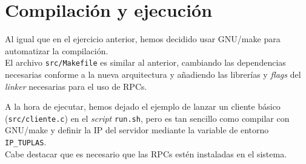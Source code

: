 \section{Compilación y ejecución}

Al igual que en el ejercicio anterior, hemos decidido usar GNU/make para automatizar la compilación.\\
El archivo \texttt{src/Makefile} es similar al anterior, cambiando las dependencias necesarias conforme a la nueva arquitectura y añadiendo las librerías y \textit{flags} del \textit{linker} necesarias para el uso de RPCs.\newline

A la hora de ejecutar, hemos dejado el ejemplo de lanzar un cliente básico (\texttt{src/cliente.c}) en el \textit{script} \texttt{run.sh}, pero es tan sencillo como compilar con GNU/make y definir la IP del servidor mediante la variable de entorno \texttt{IP\_TUPLAS}.\\
Cabe destacar que es necesario que las RPCs estén instaladas en el sistema.
